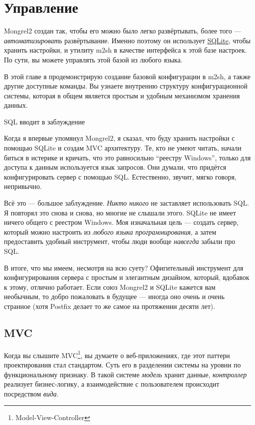 \chapter{Управление}

Mongrel2 создан так, чтобы его можно было легко развёртывать, более
того --- \emph{автоматизировать} развёртывание. Именно поэтому он
использует \href{http://www.sqlite.org/}{SQLite}, чтобы хранить
настройки, и утилиту m2sh в качестве интерфейса к этой базе настроек.
По сути, вы можете управлять этой базой из любого языка.

В этой главе я продемонстрирую создание базовой конфигурации в m2sh, а
также другие доступные команды. Вы узнаете внутренню структуру
конфигурационной системы, которая в общем является простым и удобным
механизмом хранения данных.

\begin{aside}{SQL вводит в заблуждение}

Когда я впервые упомянул Mongrel2, я сказал, что буду хранить
настройки с помощью SQLite и создам MVC архитектуру.  Те, кто не умеют
читать, начали биться в истерике и кричать, что это равносильно
``реестру Windows'', только для доступа к данным используется язык
запросов.  Они думали, что придётся конфигурировать сервер с помощью
SQL. Естественно, звучит, мягко говоря, непривычно.

Всё это --- большое заблуждение. \emph{Никто никого} не заставляет
использовать SQL.  Я повторял это снова и снова, но многие не слышали
этого.  SQLite не имеет ничего общего с реестром Windows. Моя
изначальная цель --- создать сервер, который можно настроить из
\emph{любого языка программирования}, а затем предоставить удобный
инструмент, чтобы люди вообще \emph{навсегда} забыли про SQL.

В итоге, что мы имеем, несмотря на всю суету? Офигительный инструмент
для конфигурирования сервера с простым и элегантным дизайном, который,
вдобавок к этому, отлично работает. Если союз Mongrel2 и SQLite
кажется вам необычным, то добро пожаловать в будущее --- иногда оно
очень и очень странное (хотя Postfix делает то же самое на протяжении
десяти лет).

\end{aside}


\section{MVC}

Когда вы слышите MVC\footnote{Model-View-Controller}, вы думаете о
веб-приложениях, где этот паттерн проектирования стал стандартом. Суть его в
разделении системы на уровни по функциональному признаку. В такой системе
\emph{модель} хранит данные, \emph{контроллер} реализует бизнес-логику, а
взаимодействие с пользователем происходит посредством \emph{вида}.

